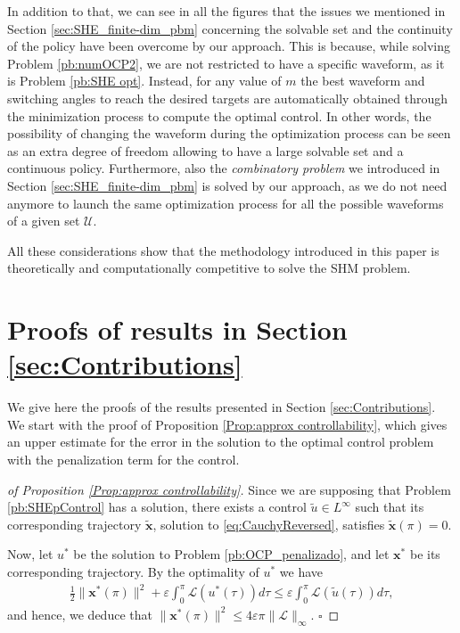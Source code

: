 \documentclass[twocolumn]{autart}    %
\begin{document}
In addition to that, we can see in all the figures that the issues we mentioned in Section \ref{sec:SHE_finite-dim_pbm} concerning the solvable set and the continuity of the policy have been overcome by our approach. This is because, while solving Problem \ref{pb:numOCP2}, we are not restricted to have a specific waveform, as it is Problem \ref{pb:SHE opt}. Instead, for any value of $m$ the best waveform and switching angles to reach the desired targets are automatically obtained through the minimization process to compute the optimal control. In other words, the possibility of changing the waveform during the optimization process can be seen as an extra degree of freedom allowing to have a large solvable set and a continuous policy. Furthermore, also the \textit{combinatory problem} we introduced in Section \ref{sec:SHE_finite-dim_pbm} is solved by our approach, as we do not need anymore to launch the same optimization process for all the possible waveforms of a given set $\mathcal U$. 

All these considerations show that the methodology introduced in this paper is theoretically and computationally competitive to solve the SHM problem.



\section{Proofs of results in Section \ref{sec:Contributions}}\label{sec:Proof}

We give here the proofs of the results presented in Section \ref{sec:Contributions}. We start with the proof of Proposition \ref{Prop:approx controllability}, which gives an upper estimate for the error in the solution to the optimal control problem with the penalization term for the control. 

\bigskip

\begin{proof}[of Proposition \ref{Prop:approx controllability}]
Since we are supposing that Problem \ref{pb:SHEpControl} has a solution, there exists a control $\tilde{u}\in L^\infty$ such that its corresponding trajectory $\tilde{\bm{x}}$, solution to \eqref{eq:CauchyReversed}, satisfies $\tilde{\bm{x}}(\pi) = 0$. 

Now, let $u^\ast$ be the solution to Problem \ref{pb:OCP_penalizado}, and let $\bm{x}^\ast$ be its corresponding trajectory. By the optimality of $u^\ast$ we have
\begin{align*}
	\frac{1}{2} \| \bm{x}^\ast(\pi)\|^2 +\varepsilon \int_0^\pi \mathcal{L}(u^\ast(\tau))d\tau \leq \varepsilon \int_0^\pi \mathcal{L}(\tilde{u}(\tau))d\tau,
\end{align*}
and hence, we deduce that $\| \bm{x}^\ast (\pi)\|^2 \leq 4 \varepsilon \pi \| \mathcal{L}\|_\infty.$ \hfill $\square$
\end{proof}
\end{document}
